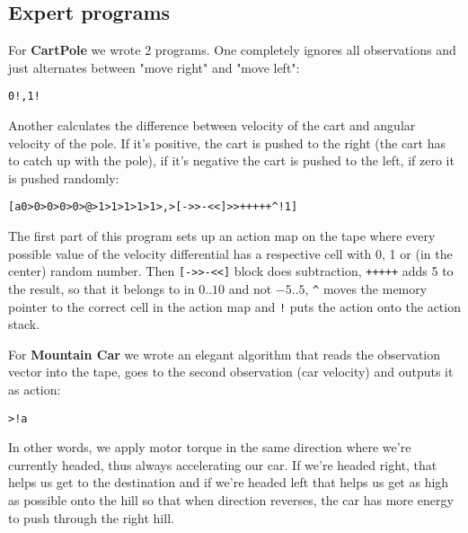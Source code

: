 \subsection{Expert programs}
\label{sec:expert-progs}

For \textbf{CartPole} we wrote 2 programs. 
One completely ignores all observations and just alternates between "move right" and "move left":

\begin{center}
\begin{lstlisting}
0!,1!
\end{lstlisting}
\end{center}

Another calculates the difference between velocity of the cart and angular velocity of the pole.
If it's positive, the cart is pushed to the right (the cart has to catch up with the pole), if it's negative the cart is pushed to the left, if zero it is pushed randomly:

\begin{center}
\begin{lstlisting}
[a0>0>0>0>0>@>1>1>1>1>1>,>[->>-<<]>>+++++^!1]
\end{lstlisting}
\end{center}

The first part of this program sets up an action map on the tape where every possible value of the velocity differential has a respective cell with 0, 1 or (in the center) random number.
Then \verb|[->>-<<]| block does subtraction, \verb|+++++| adds 5 to the result, so that it belongs to in $0..10$ and not $-5..5$, \verb|^| moves the memory pointer to the correct cell in the action map and \verb|!| puts the action onto the action stack.

For \textbf{Mountain Car} we wrote an elegant algorithm that reads the observation vector into the tape, goes to the second observation (car velocity) and outputs it as action:

\begin{center}
\begin{lstlisting}
>!a
\end{lstlisting}
\end{center}

In other words, we apply motor torque in the same direction where we're currently headed, thus always accelerating our car.
If we're headed right, that helps us get to the destination and if we're headed left that helps us get as high as possible onto the hill so that when direction reverses, the car has more energy to push through the right hill.

